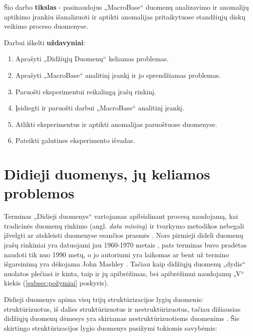 \documentclass{VUMIFPSkursinis}
\begin{document}
Šio darbo \textbf{tikslas} - pasinaudojus „MacroBase“ duomenų analizavimo ir anomalijų aptikimo įrankiu išanalizuoti ir aptikti anomalijas pritaikytuose standžiųjų diskų veikimo proceso duomenyse.\par

Darbui iškelti \textbf{uždavyniai}:\par

\begin{enumerate}
\item Aprašyti „Didžiųjų Duomenų“ keliamas problemas.
\item Aprašyti „MacroBase“ analitinį įrankį ir jo sprendžiamas problemas.
\item Paruošti eksperimentui reikalingą įrašų rinkinį.
\item Įsidiegti ir paruošti darbui „MacroBase“ analitinį įrankį.
\item Atlikti eksperimentus ir aptikti anomalijas paruoštuose duomenyse.
\item Pateikti galutines eksperimento išvadas.
\end{enumerate}

\section{Didieji duomenys, jų keliamos problemos} \label{sec:bigdata}
Terminas „Didieji duomenys“ vartojamas apibūdinant procesą naudojamą, kai tradicinės duomenų rinkimo (angl. \textit{data mining}) ir tvarkymo metodikos nebegali įžvelgti ar atskleisti duomenyse esančios prasmės \cite{bigdata}. Nors pirmieji dideli duomenų įrašų rinkiniai yra datuojami jau 1960-1970 metais \cite{first_bigdata}, pats terminas buvo pradėtas naudoti tik nuo 1990 metų, o jo autoriumi yra laikomas ar bent už termino išgarsinimą yra dėkojama John Mashley \cite{john_1, john_2, john_3}. Tačiau kaip didžiųjų duomenų „dydis“ nuolatos plečiasi ir kinta, taip ir jų apibrėžimas, bei apibrėžimui naudojamų „V“ kiekis (\ref{subsec:požymiai} poskyris).\par

Didieji duomenys apima visų trijų struktūrizacijos lygių duomenis: struktūrizuotus, iš dalies struktūrizuotus ir nestruktūrizuotus, tačiau dižiausias didžiųjų duomenų dėmesys yra skiriamas nestruktūrizuotiems duomenims \cite{bigdata_data_struct}. Šie skirtingo struktūrizacijos lygio duomenys pasižymi tokiomis savybėmis:
\end{document}
